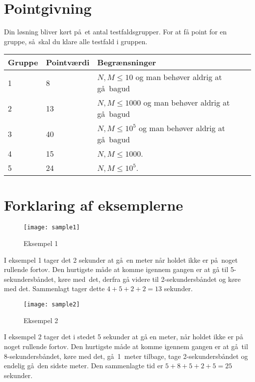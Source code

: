 \section*{Pointgivning}
Din løsning bliver kørt på et antal testfaldsgrupper.
For at få point for en gruppe, så skal du klare alle testfald i gruppen.

\noindent
\begin{tabular}{| l | l | l |}
\hline
Gruppe & Pointværdi & Begrænsninger \\ \hline
1     & 8          &  $N,M \le 10$ og man behøver aldrig at gå bagud\\ \hline
2     & 13         &  $N,M \le 1000$ og man behøver aldrig at gå bagud\\ \hline
3     & 40         &  $N,M \le 10^5$ og man behøver aldrig at gå bagud\\ \hline
4     & 15         &  $N,M \le 1000$. \\ \hline
5     & 24         &  $N,M \le 10^5$. \\ \hline
\end{tabular}

\section*{Forklaring af eksemplerne}

\begin{figure}[h]
	\centering
\texttt{[image: sample1]}
\caption{Eksempel 1}
\end{figure}
I eksempel 1 tager det 2 sekunder at gå en meter når holdet ikke er på noget rullende fortov.
Den hurtigste måde at komme igennem gangen er at gå til 5-sekundersbåndet, køre med det, derfra gå videre til 2-sekundersbåndet og køre med det.
Sammenlagt tager dette $4+5+2+2=13$ sekunder.



\begin{figure}[h]
	\centering
\texttt{[image: sample2]}
\caption{Eksempel 2}
\end{figure}
I eksempel 2 tager det i stedet 5 sekunder at gå en meter, når holdet ikke er på noget rullende fortov.
Den hurtigste måde at komme igennem gangen er at gå til 8-sekundersbåndet, køre med det, gå 1~meter tilbage, tage 2-sekundersbåndet og endelig gå den sidste meter.
Den sammenlagte tid er $5+8+5+2+5=25$ sekunder.
